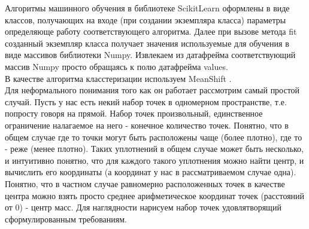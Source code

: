 \documentclass[11pt]{article}
\begin{document}
    Алгоритмы машинного обучения в библиотеке ScikitLearn оформлены в виде
классов, получающих на входе (при создании экземпляра класса) параметры
определяюще работу соответствующего алгоритма. Далее при вызове метода
fit созданный экземпляр класса получает значения используемые для
обучения в виде массивов библиотеки Numpy. Извлекаем из датафрейма
соответствующий массив Numpy просто обращаясь к полю датафрейма values.
\\ В качестве алгоритма класстеризации используем MeanShift
\cite{litlink2} \cite{litlink5}. \\ Для неформального
понимания того как он работает рассмотрим самый простой случай. Пусть у
нас есть некий набор точек в одномерном пространстве, т.е. попросту
говоря на прямой. Набор точек произвольный, единственное ограничение
налагаемое на него - конечное количество точек. Понятно, что в общем
случае где то точки могут быть расположены чаще (более плотно), где то -
реже (менее плотно). Таких уплотнений в общем случае может быть
несколько, и интуитивно понятно, что для каждого такого уплотнения можно
найти центр, и вычислить его координаты (а координат у нас в
рассматриваемом случае одна). Понятно, что в частном случае равномерно
расположенных точек в качестве центра можно взять просто среднее
арифметическое координат точек (расстояний от 0) - центр масс. Для
наглядности нарисуем набор точек удовлятворящий сформулированным
требованиям.
\end{document}
